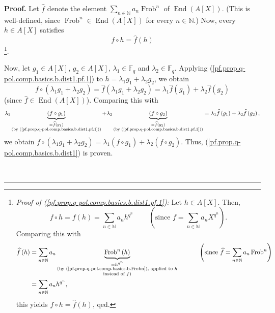 \documentclass[numbers=enddot,12pt,final,onecolumn,notitlepage]{scrartcl}%
\theoremstyle{definition}
\newenvironment{proof}[1][Proof]{\noindent\textbf{#1.} }{\ \rule{0.5em}{0.5em}}
\let\sumnonlimits\sum
\renewcommand{\sum}{\sumnonlimits\limits}
\begin{document}
\begin{proof}
Let $\widehat{f}$ denote the element $\sum_{n\in\mathbb{N}}a_{n}%
\operatorname*{Frob}\nolimits^{n}$ of $\operatorname*{End}\left(  A\left[
X\right]  \right)  $. (This is well-defined, since $\operatorname*{Frob}%
\nolimits^{n}\in\operatorname*{End}\left(  A\left[  X\right]  \right)  $ for
every $n\in\mathbb{N}$.) Now, every $h\in A\left[  X\right]  $ satisfies%
\begin{equation}
f\circ h=\widehat{f}\left(  h\right)
\label{pf.prop.q-pol.comp.basics.b.dist1.pf.1}%
\end{equation}
\footnote{\textit{Proof of (\ref{pf.prop.q-pol.comp.basics.b.dist1.pf.1}):}
Let $h\in A\left[  X\right]  $. Then,%
\[
f\circ h=f\left(  h\right)  =\sum_{n\in\mathbb{N}}a_{n}h^{q^{n}}%
\ \ \ \ \ \ \ \ \ \ \left(  \text{since }f=\sum_{n\in\mathbb{N}}a_{n}X^{q^{n}%
}\right)  .
\]
Comparing this with%
\begin{align*}
\widehat{f}\left(  h\right)   &  =\sum_{n\in\mathbb{N}}a_{n}%
\underbrace{\operatorname*{Frob}\nolimits^{n}\left(  h\right)  }%
_{\substack{=h^{q^{n}}\\\text{(by (\ref{pf.prop.q-pol.comp.basics.b.Frobn}),
applied to }h\\\text{instead of }f\text{)}}}\ \ \ \ \ \ \ \ \ \ \left(
\text{since }\widehat{f}=\sum_{n\in\mathbb{N}}a_{n}\operatorname*{Frob}%
\nolimits^{n}\right) \\
&  =\sum_{n\in\mathbb{N}}a_{n}h^{q^{n}},
\end{align*}
this yields $f\circ h=\widehat{f}\left(  h\right)  $, qed.}.

Now, let $g_{1}\in A\left[  X\right]  $, $g_{2}\in A\left[  X\right]  $,
$\lambda_{1}\in\mathbb{F}_{q}$ and $\lambda_{2}\in\mathbb{F}_{q}$. Applying
(\ref{pf.prop.q-pol.comp.basics.b.dist1.pf.1}) to $h=\lambda_{1}g_{1}%
+\lambda_{2}g_{2}$, we obtain%
\[
f\circ\left(  \lambda_{1}g_{1}+\lambda_{2}g_{2}\right)  =\widehat{f}\left(
\lambda_{1}g_{1}+\lambda_{2}g_{2}\right)  =\lambda_{1}\widehat{f}\left(
g_{1}\right)  +\lambda_{2}\widehat{f}\left(  g_{2}\right)
\]
(since $\widehat{f}\in\operatorname*{End}\left(  A\left[  X\right]  \right)
$). Comparing this with%
\[
\lambda_{1}\underbrace{\left(  f\circ g_{1}\right)  }_{\substack{=\widehat{f}%
\left(  g_{1}\right)  \\\text{(by
(\ref{pf.prop.q-pol.comp.basics.b.dist1.pf.1}))}}}+\lambda_{2}%
\underbrace{\left(  f\circ g_{2}\right)  }_{\substack{=\widehat{f}\left(
g_{2}\right)  \\\text{(by (\ref{pf.prop.q-pol.comp.basics.b.dist1.pf.1}))}%
}}=\lambda_{1}\widehat{f}\left(  g_{1}\right)  +\lambda_{2}\widehat{f}\left(
g_{2}\right)  ,
\]
we obtain $f\circ\left(  \lambda_{1}g_{1}+\lambda_{2}g_{2}\right)
=\lambda_{1}\left(  f\circ g_{1}\right)  +\lambda_{2}\left(  f\circ
g_{2}\right)  $. Thus, (\ref{pf.prop.q-pol.comp.basics.b.dist1}) is proven.


\end{proof}
\end{document}
